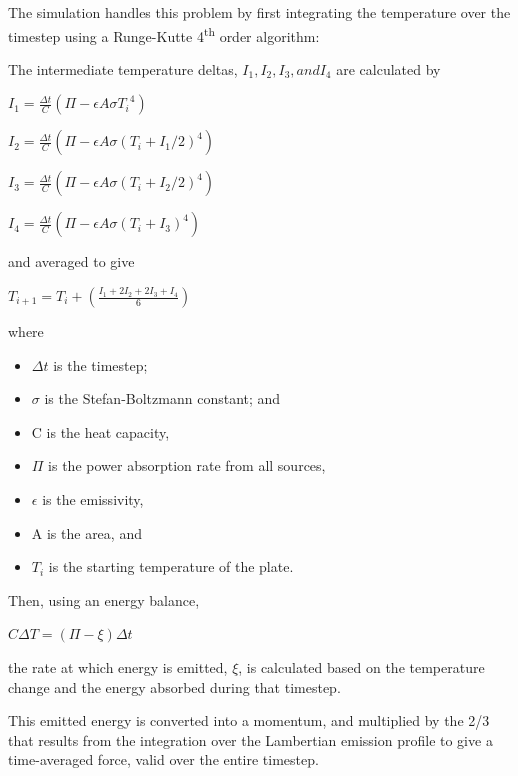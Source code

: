       The simulation handles this problem by first integrating the temperature
      over the timestep using a Runge{}-Kutte 4\textsuperscript{th} order
      algorithm:

      The intermediate temperature deltas, $I_{1}, I_{2}, I_{3}, and I_{4}$
      are calculated by

      $I_{1}={\frac{\Delta t}{C}}\left( {\Pi-\epsilon A \sigma {T_{i}}^{4}}
      \right)$

      $I_{2}={\frac{\Delta t}{C}}\left( {\Pi-\epsilon A \sigma \left( {
      T_{i} + I_{1}/2} \right) ^{4} } \right)$

      $I_{3}={\frac{\Delta t}{C}}\left( {\Pi-\epsilon A \sigma \left( {
      T_{i} + I_{2}/2} \right) ^{4} } \right)$

      $I_{4}={\frac{\Delta t}{C}}\left( {\Pi-\epsilon A \sigma \left( {
      T_{i} + I_{3}} \right) ^{4} } \right)$

      and averaged to give

      $T_{i+1} = T_{i} + \left( \frac {I_{1}+2I_{2}+2I_{3}+I_{4}}{6}
      \right)$

      where
      \begin{itemize}
        \item{}$\Delta t$ is the timestep;
        \item{}$\sigma$ is the Stefan-Boltzmann constant; and
        \item{}C is the heat capacity,
        \item{}$\Pi$ is the power absorption rate from all sources,
        \item{}$\epsilon$ is the emissivity,
        \item{}A is the area, and
        \item{}$T_{i}$ is the starting temperature of the plate.
      \end{itemize}

      Then, using an energy balance,

      $C \Delta T = \left( \Pi - \xi \right) \Delta t$

      the rate at which energy is emitted, $\xi$, is
      calculated based on the temperature change and the energy absorbed
      during that timestep.

      This emitted energy is converted into a
      momentum, and multiplied by the 2/3 that results from the integration
      over the Lambertian emission profile to give a time{}-averaged
      force, valid over the entire timestep.

